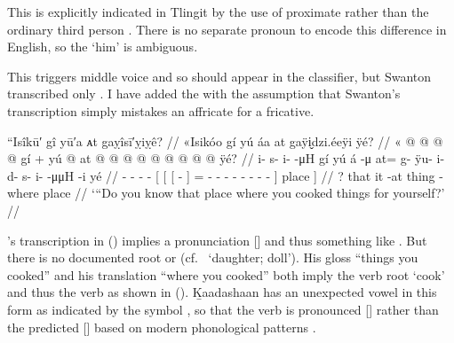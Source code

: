 This is explicitly indicated in Tlingit by the use of proximate  rather than the ordinary third person .
There is no separate pronoun to encode this difference in English, so the ‘him’ is ambiguous.

This triggers middle voice and so  should appear in the classifier, but Swanton transcribed only .
I have added the  with the assumption that Swanton’s transcription simply mistakes an affricate for a fricative.

\ex\label{ex:100-78-place-where-you-cooked}%
%
\begingl
	\glpreamble	“Isîkū′ gî yū′a ᴀt gaỵîsī′ỵiỵê? //
	\glpreamble	«\!Isikóo gí yú áa at gaÿi̬dzi.éeÿi ÿé? //
	\gla	«\! @ {} @ {} @ {} @ {} gí +
		{} yú {} {}  @ {} {} 
			at @  @ {} @ {} @ {} @ {} @ {} @ {} @ {} @ {} {} ÿé? {} //
	\glb	\pqp{}i- s- i-  -μH gí
		{} yú {} {} á -μ {} 
			at= g- ÿu- i- d- s- i-  -μμH -i {} yé {} //
	\glc	\pqp{}- - -  - 
		{}[  {}[ {}[  - {}]
			= - - - - - - 
				 - - {}]
		place {}] //
	\gld	\pqp{} {} {} {} {} ?
		{} that {} {} it -at {}
			thing  {} {} {} {} {} {} {} -where {} place {} //
	\glft	‘“Do you know that place where you cooked things for yourself?’
		//
\endgl
\xe

\citeauthor{swanton:1909}’s transcription  in (\lastx) implies a pronunciation [] and thus something like .
But there is no documented root  or  (cf.\  ‘daughter; doll’).
His gloss “things you cooked” and his translation “where you cooked” both imply the verb root  ‘cook’ and thus the verb as shown in (\lastx).
Ḵaadashaan has an unexpected vowel in this form as indicated by the symbol , so that the verb is pronounced  [] rather than the predicted  [] based on modern phonological patterns \parencite[188]{leer:1991}.

